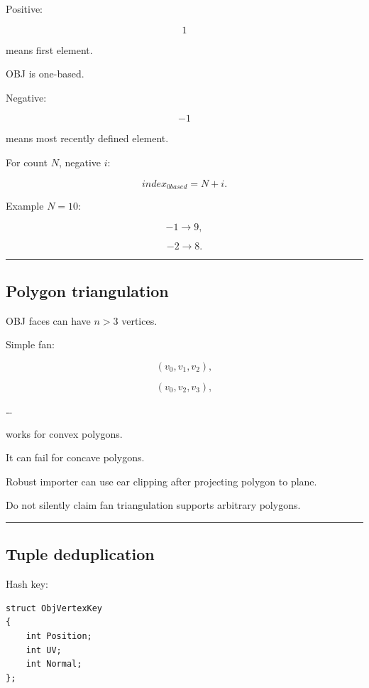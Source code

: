 Positive:

\[
1
\]

means first element.

OBJ is one-based.

Negative:

\[
-1
\]

means most recently defined element.

For count \(N\), negative \(i\):

\[
\boxed{
index_{0based}
=
N+i.
}
\]

Example \(N=10\):

\[
-1\rightarrow9,
\]

\[
-2\rightarrow8.
\]

\begin{center}\rule{0.5\linewidth}{0.5pt}\end{center}

\subsection{Polygon triangulation}\label{04-visual-computing-ii-ch041-polygon-triangulation}

OBJ faces can have \(n>3\) vertices.

Simple fan:

\[
(v_0,v_1,v_2),
\]

\[
(v_0,v_2,v_3),
\]

\ldots{}

works for convex polygons.

It can fail for concave polygons.

Robust importer can use ear clipping after projecting polygon to plane.

Do not silently claim fan triangulation supports arbitrary polygons.

\begin{center}\rule{0.5\linewidth}{0.5pt}\end{center}

\subsection{Tuple deduplication}\label{04-visual-computing-ii-ch041-tuple-deduplication}

Hash key:

\begin{verbatim}
struct ObjVertexKey
{
    int Position;
    int UV;
    int Normal;
};
\end{verbatim}

